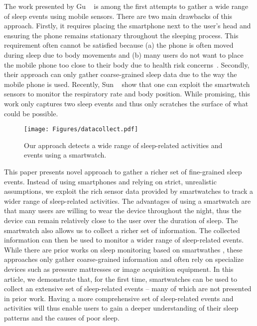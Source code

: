 The work presented by Gu \etal~\cite{gu2016sleep} is among the first attempts to gather  a wide range of sleep events using mobile sensors.
There are two main drawbacks of this approach. Firstly, it requires placing the smartphone next to the user's head and ensuring the phone
remains stationary throughout the sleeping process. This requirement often cannot be satisfied because (a) the phone is often moved during
sleep due to body movements and (b) many users do not want to place the mobile phone too close to their body due to health risk
concerns~\cite{StepHealth,Quorasleep}.  Secondly, their approach can only gather coarse-grained sleep data due to the way the mobile phone
is used. Recently, Sun \etal~\cite{sleepmonitor} show that one can exploit the smartwatch sensors to monitor the respiratory  rate and body
position. While promising, this work only captures two sleep events and thus only scratches the surface of what could be possible.


\begin{figure}[!t]
\centering
\setlength{\belowcaptionskip}{-13pt}
      \texttt{[image: Figures/datacollect.pdf]}
  \caption{Our approach detects a wide range of sleep-related activities and events using a smartwatch.}\label{fig:datacollect}
\end{figure}

This paper presents novel approach to gather a richer set of fine-grained sleep events. Instead of using smartphones and relying on strict,
unrealistic assumptions, we exploit the rich sensor data provided by smartwatches to track a wider range of sleep-related activities. The
advantages of using a smartwatch are that many users are willing to wear the device throughout the night, thus the device can remain
relatively close to the user over the duration of sleep. The smartwatch also allows us to collect a richer set of information. The
collected information can then be used to monitor a wider range of sleep-related events. While there are prior works on sleep monitoring
based on smartwathes \cite{pombo2016ubisleep,shelgikar2016sleep,haescher2015anomaly,borazio2012combining}, these approaches only gather
coarse-grained information and often rely on specialize devices such as pressure mattresses or image acquisition equipment. In this
article, we demonstrate that, for the first time, smartwatches can be used to collect an extensive set of sleep-related events -- many of
which are not presented in prior work. Having a more comprehensive set of sleep-related events and activities will thus enable users to
gain a deeper understanding of their sleep patterns and the causes of poor sleep.

